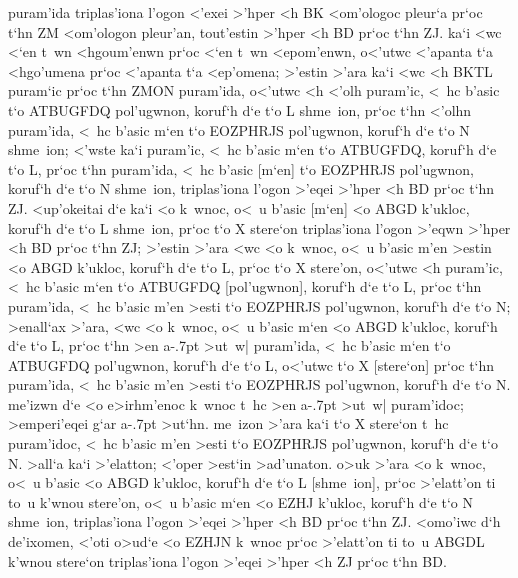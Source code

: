 \begin{Parallel}{}{}
{{puram'ida triplas'iona l'ogon <'exei >'hper <h BK <om'ologoc pleur`a pr`oc t`hn ZM
<om'ologon pleur'an, tout'estin >'hper <h BD pr`oc t`hn ZJ. ka`i <wc <`en t~wn
<hgoum'enwn pr`oc <`en t~wn <epom'enwn, o<'utwc <'apanta t`a <hgo'umena
pr`oc <'apanta t`a <ep'omena; >'estin >'ara ka`i <wc <h BKTL puram`ic pr`oc
t`hn ZMON puram'ida, o<'utwc <h <'olh puram'ic, <~hc b'asic t`o ATBUGFDQ pol'ugwnon,
koruf`h d`e t`o L shme~ion, pr`oc t`hn <'olhn puram'ida, <~hc b'asic m`en t`o EOZPHRJS pol'ugwnon,
koruf`h d`e t`o N shme~ion; <'wste ka`i puram'ic, <~hc b'asic m`en t`o ATBUGFDQ, koruf`h
d`e t`o L, pr`oc t`hn puram'ida, <~hc b'asic [m`en] t`o EOZPHRJS pol'ugwnon, koruf`h
d`e t`o N shme~ion, triplas'iona l'ogon >'eqei >'hper <h BD pr`oc t`hn ZJ. <up'okeitai d`e ka`i
<o k~wnoc, o<~u b'asic [m`en]
<o ABGD k'ukloc, koruf`h d`e t`o L shme~ion, pr`oc t`o X stere`on triplas'iona l'ogon >'eqwn
>'hper <h BD pr`oc t`hn ZJ;  >'estin >'ara <wc <o k~wnoc, o<~u b'asic m'en >estin <o ABGD k'ukloc,
koruf`h d`e t`o L, pr`oc t`o X stere'on, o<'utwc <h puram'ic, <~hc b'asic m`en t`o ATBUGFDQ [pol'ugwnon],
koruf`h d`e t`o L, pr`oc t`hn puram'ida, <~hc b'asic m'en >esti t`o EOZPHRJS pol'ugwnon, koruf`h
d`e t`o N; >enall`ax >'ara, <wc <o k~wnoc, o<~u b'asic m`en <o ABGD k'ukloc, koruf`h d`e
t`o L, pr`oc t`hn >en a\kern -.7pt >ut~w| puram'ida, <~hc b'asic m`en t`o ATBUGFDQ pol'ugwnon, koruf`h
d`e t`o L, o<'utwc t`o X [stere`on] pr`oc t`hn puram'ida, <~hc b'asic m'en >esti t`o EOZPHRJS
pol'ugwnon, koruf`h d`e t`o N. me'izwn d`e <o e>irhm'enoc k~wnoc t~hc >en a\kern -.7pt >ut~w|
puram'idoc; >emperi'eqei g`ar a\kern -.7pt >ut`hn. me~izon >'ara ka`i t`o X stere`on t~hc puram'idoc, <~hc b'asic
m'en >esti t`o EOZPHRJS pol'ugwnon, koruf`h d`e t`o N. >all`a ka`i >'elatton; <'oper >est`in >ad'unaton.
o>uk >'ara <o k~wnoc, o<~u b'asic <o ABGD k'ukloc, koruf`h d`e t`o L [shme~ion], pr`oc >'elatt'on
ti to~u k'wnou stere'on, o<~u b'asic m`en <o EZHJ k'ukloc, koruf`h d`e t`o N shme~ion, triplas'iona
l'ogon >'eqei >'hper <h BD pr`oc t`hn ZJ. <omo'iwc d`h de'ixomen, <'oti o>ud`e <o EZHJN k~wnoc
pr`oc >'elatt'on ti to~u ABGDL k'wnou stere`on triplas'iona l'ogon >'eqei >'hper <h ZJ pr`oc t`hn BD.}



}
\end{Parallel}
